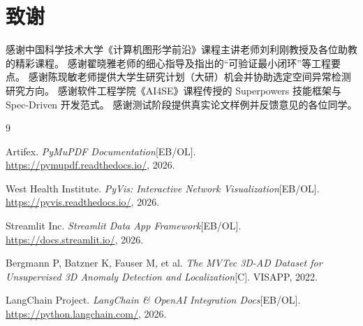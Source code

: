 \documentclass[a4paper,11pt]{article}
\begin{document}
\section*{致谢}
感谢中国科学技术大学《计算机图形学前沿》课程主讲老师刘利刚教授及各位助教的精彩课程。
感谢翟晓雅老师的细心指导及指出的``可验证最小闭环''等工程要点。
感谢陈现敏老师提供大学生研究计划（大研）机会并协助选定空间异常检测研究方向。
感谢软件工程学院《AI4SE》课程传授的 Superpowers 技能框架与 Spec-Driven 开发范式。
感谢测试阶段提供真实论文样例并反馈意见的各位同学。

\begin{thebibliography}{9}

Artifex. \textit{PyMuPDF Documentation}[EB/OL]. \\ \url{https://pymupdf.readthedocs.io/}, 2026.

West Health Institute. \textit{PyVis: Interactive Network Visualization}[EB/OL]. \\ \url{https://pyvis.readthedocs.io/}, 2026.

Streamlit Inc. \textit{Streamlit Data App Framework}[EB/OL]. \\ \url{https://docs.streamlit.io/}, 2026.

Bergmann P, Batzner K, Fauser M, et al. \textit{The MVTec 3D-AD Dataset for Unsupervised 3D Anomaly Detection and Localization}[C]. VISAPP, 2022.

LangChain Project. \textit{LangChain \& OpenAI Integration Docs}[EB/OL]. \\ \url{https://python.langchain.com/}, 2026.

\end{thebibliography}
\end{document}
